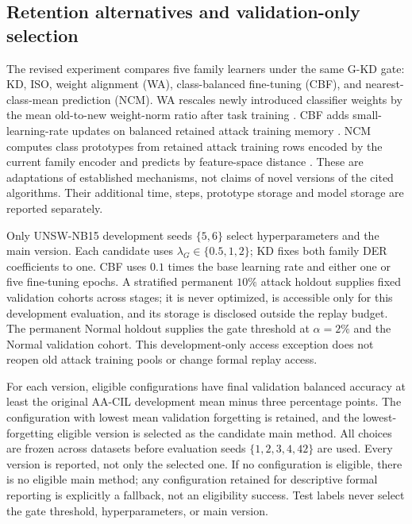 \documentclass[10pt,twocolumn]{article}
\begin{document}
\subsection{Retention alternatives and validation-only selection}
The revised experiment compares five family learners under the same G-KD gate: KD, ISO, weight alignment (WA), class-balanced fine-tuning (CBF), and nearest-class-mean prediction (NCM). WA rescales newly introduced classifier weights by the mean old-to-new weight-norm ratio after task training \citep{wa}. CBF adds small-learning-rate updates on balanced retained attack training memory \citep{eeil}. NCM computes class prototypes from retained attack training rows encoded by the current family encoder and predicts by feature-space distance \citep{icarl}. These are adaptations of established mechanisms, not claims of novel versions of the cited algorithms. Their additional time, steps, prototype storage and model storage are reported separately.

Only UNSW-NB15 development seeds $\{5,6\}$ select hyperparameters and the main version. Each candidate uses $\lambda_G\in\{0.5,1,2\}$; KD fixes both family DER coefficients to one. CBF uses $0.1$ times the base learning rate and either one or five fine-tuning epochs. A stratified permanent $10\%$ attack holdout supplies fixed validation cohorts across stages; it is never optimized, is accessible only for this development evaluation, and its storage is disclosed outside the replay budget. The permanent Normal holdout supplies the gate threshold at $\alpha=2\%$ and the Normal validation cohort. This development-only access exception does not reopen old attack training pools or change formal replay access.

For each version, eligible configurations have final validation balanced accuracy at least the original AA-CIL development mean minus three percentage points. The configuration with lowest mean validation forgetting is retained, and the lowest-forgetting eligible version is selected as the candidate main method. All choices are frozen across datasets before evaluation seeds $\{1,2,3,4,42\}$ are used. Every version is reported, not only the selected one. If no configuration is eligible, there is no eligible main method; any configuration retained for descriptive formal reporting is explicitly a fallback, not an eligibility success. Test labels never select the gate threshold, hyperparameters, or main version.
\end{document}
